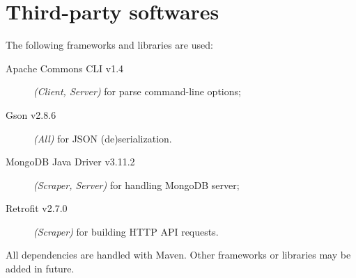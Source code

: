 \section{Third-party softwares}\label{sec:dependencies}

The following frameworks and libraries are used:
\begin{description}
	\item[Apache Commons CLI v1.4] \textit{(Client, Server)} for parse
		command-line options;
	\item[Gson v2.8.6] \textit{(All)} for JSON (de)serialization.
	\item[MongoDB Java Driver v3.11.2] \textit{(Scraper, Server)} for
		handling MongoDB server;
	\item[Retrofit v2.7.0] \textit{(Scraper)} for building HTTP API
		requests.
\end{description}

All dependencies are handled with Maven. Other frameworks or libraries may be
added in future.
